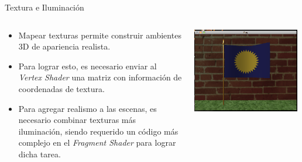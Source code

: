 \documentclass[aspectratio=169,compress]{beamer}
\begin{document}
\begin{frame}{Textura e Iluminación}
\begin{columns}
\begin{column}{0.5\textwidth}
\begin{itemize}
\item Mapear texturas permite construir ambientes 3D de apariencia realista. 
\item Para lograr esto, es necesario enviar al \textit{Vertex Shader} una matriz con información de coordenadas de textura. 
\item Para agregar realismo a las escenas, es necesario combinar texturas más iluminación, siendo requerido un código más complejo en el \textit{Fragment Shader} para lograr dicha tarea. 
\end{itemize}
\end{column}
\begin{column}{0.5\textwidth}
\begin{center}
 \includegraphics[width=0.98\textwidth]{FigsOpenGL/Textura_e_Iluminacion}
\end{center}
\end{column}
\end{columns}

\end{frame}
\end{document}
